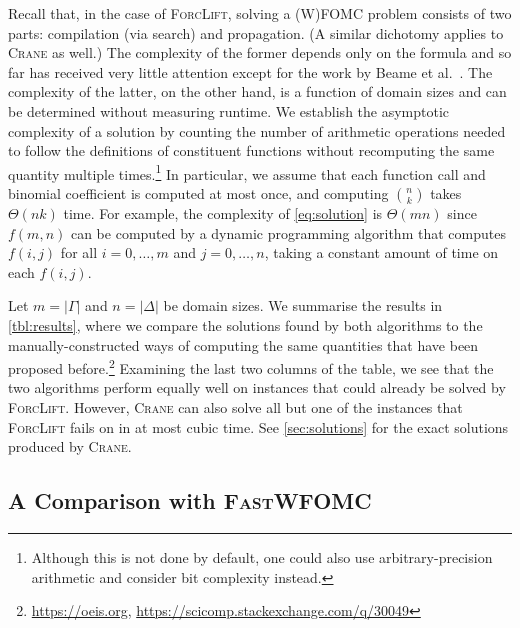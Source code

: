 \documentclass{article}
\begin{document}

Recall that, in the case of \textsc{ForcLift}, solving a (W)FOMC problem
consists of two parts: compilation (via search) and propagation. (A similar
dichotomy applies to \textsc{Crane} as well.) The complexity of the former
depends only on the formula and so far has received very little attention except
for the work by Beame et al.~. The
complexity of the latter, on the other hand, is a function of domain sizes and
can be determined without measuring runtime. We establish the asymptotic
complexity of a solution by counting the number of arithmetic operations needed
to follow the definitions of constituent functions without recomputing the same
quantity multiple times.\footnote{Although this is not done by default, one
  could also use arbitrary-precision arithmetic and consider bit complexity
  instead.} In particular, we assume that each function call and binomial
coefficient is computed at most once, and computing $\binom{n}{k}$ takes
$\Theta(nk)$ time. For example, the complexity of \cref{eq:solution} is
$\Theta(mn)$ since $f(m, n)$ can be computed by a dynamic programming algorithm
that computes $f(i, j)$ for all $i = 0, \dots, m$ and $j = 0, \dots, n$, taking
a constant amount of time on each $f(i, j)$.

Let $m = |\Gamma|$ and $n = |\Delta|$ be domain sizes. We summarise the results
in \cref{tbl:results}, where we compare the solutions found by both algorithms
to the manually-constructed ways of computing the same quantities that have been
proposed before.\footnote{\url{https://oeis.org},
  \url{https://scicomp.stackexchange.com/q/30049}} Examining the last two
columns of the table, we see that the two algorithms perform equally well on
instances that could already be solved by \textsc{ForcLift}. However,
\textsc{Crane} can also solve all but one of the instances that
\textsc{ForcLift} fails on in at most cubic time. See \cref{sec:solutions} for
the exact solutions produced by \textsc{Crane}.

\subsection{A Comparison with \textsc{\normalfont FastWFOMC}}
\end{document}
